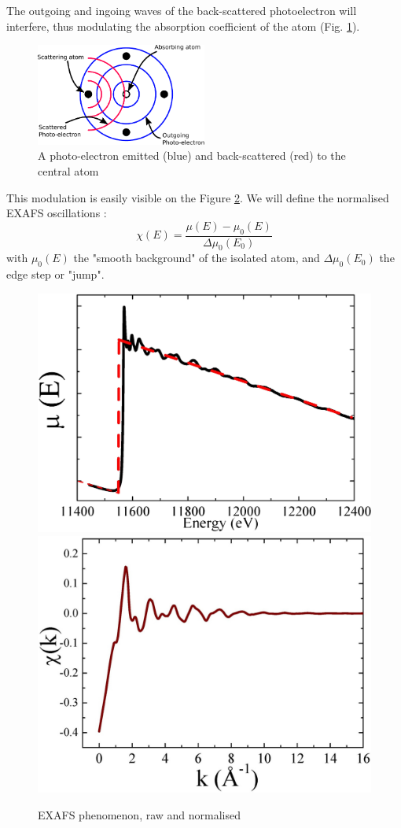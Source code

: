 \documentclass[11pt,a4paper,oneside]{report}
\begin{document}
The outgoing and ingoing waves of the back-scattered photoelectron will interfere, thus modulating the absorption coefficient of the atom (Fig. \ref{scatteringschema}).
\begin{figure}[H]
    \begin{center}
        \includegraphics[width=0.5\textwidth]{Images/Scattering}
        \caption{A photo-electron emitted (blue) and back-scattered (red) to the central atom}
        \label{scatteringschema}
    \end{center}
\end{figure}

This modulation is easily visible on the Figure \ref{exafsgraph}. We will define the normalised EXAFS oscillations :
\[\chi(E) = \frac{\mu(E) - \mu_0(E)}{\Delta\mu_0(E_0)}\]
with $\mu_0(E)$ the "smooth background" of the isolated atom, and $\Delta\mu_0(E_0)$ the edge step or "jump".

\begin{figure}[H]
    \begin{center}
        \includegraphics[height=0.35\textwidth]{Images/EXAFS2}
        \includegraphics[height=0.35\textwidth]{Images/relativeEXAFS}
        \caption{EXAFS phenomenon, raw and normalised}
        \label{exafsgraph}
    \end{center}
\end{figure}
\end{document}
